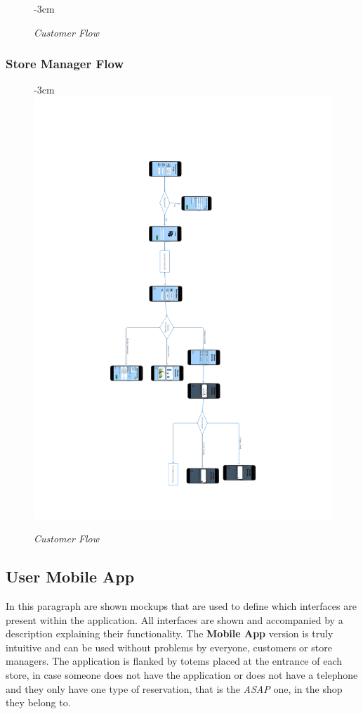 \documentclass{article}
\begin{document}
\begin{figure}[H]
\begin{adjustwidth} {-3cm}{}
				\end{adjustwidth}
				\caption{\emph{Customer Flow}}
			\end{figure}
		\newpage
		\subsubsection{Store Manager Flow}
		\begin{figure}[H]
			\begin{adjustwidth} {-3cm}{}
				\centering
				\includegraphics[scale=0.7, angle=180, trim= 0 0 0 -5cm]{../Mockups/UXDiagrams/StoreManagerFlow.pdf} \\
			\end{adjustwidth}
			\caption{\emph{Customer Flow}}
		\end{figure}
		\newpage

	\subsection{User Mobile App}
	In this paragraph are shown mockups that are used to define which interfaces are present within the application. All interfaces are shown and accompanied by a description explaining their functionality. The {\bfseries Mobile App} version is truly intuitive and can be used without problems by everyone, customers or store managers. The application is flanked by totems placed at the entrance of each store, in case someone does not have the application or does not have a telephone and they only have one type of reservation, that is the \emph{ASAP} one, in the shop they belong to.
	\newpage
\end{document}
